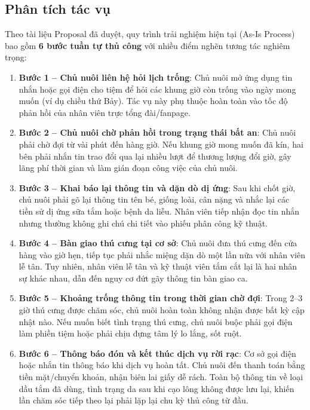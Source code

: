 \subsection{Phân tích tác vụ}
Theo tài liệu Proposal đã duyệt, quy trình trải nghiệm hiện tại (As-Is Process) bao gồm \textbf{6 bước tuần tự thủ công} với nhiều điểm nghẽn tương tác nghiêm trọng:
\begin{enumerate}
    \item \textbf{Bước 1 -- Chủ nuôi liên hệ hỏi lịch trống}: Chủ nuôi mở ứng dụng tin nhắn hoặc gọi điện cho tiệm để hỏi các khung giờ còn trống vào ngày mong muốn (ví dụ chiều thứ Bảy). Tác vụ này phụ thuộc hoàn toàn vào tốc độ phản hồi của nhân viên trực tổng đài/fanpage.
    \item \textbf{Bước 2 -- Chủ nuôi chờ phản hồi trong trạng thái bất an}: Chủ nuôi phải chờ đợi từ vài phút đến hàng giờ. Nếu khung giờ mong muốn đã kín, hai bên phải nhắn tin trao đổi qua lại nhiều lượt để thương lượng đổi giờ, gây lãng phí thời gian và làm gián đoạn công việc của chủ nuôi.
    \item \textbf{Bước 3 -- Khai báo lại thông tin và dặn dò dị ứng}: Sau khi chốt giờ, chủ nuôi phải gõ lại thông tin tên bé, giống loài, cân nặng và nhắc lại các tiền sử dị ứng sữa tắm hoặc bệnh da liễu. Nhân viên tiếp nhận đọc tin nhắn nhưng thường không ghi chú chi tiết vào phiếu phân công kỹ thuật.
    \item \textbf{Bước 4 -- Bàn giao thú cưng tại cơ sở}: Chủ nuôi đưa thú cưng đến cửa hàng vào giờ hẹn, tiếp tục phải nhắc miệng dặn dò một lần nữa với nhân viên lễ tân. Tuy nhiên, nhân viên lễ tân và kỹ thuật viên tắm cắt lại là hai nhân sự khác nhau, dẫn đến nguy cơ đứt gãy thông tin bàn giao ca.
    \item \textbf{Bước 5 -- Khoảng trống thông tin trong thời gian chờ đợi}: Trong 2--3 giờ thú cưng được chăm sóc, chủ nuôi hoàn toàn không nhận được bất kỳ cập nhật nào. Nếu muốn biết tình trạng thú cưng, chủ nuôi buộc phải gọi điện làm phiền tiệm hoặc phải chịu đựng tâm lý lo lắng, sốt ruột.
    \item \textbf{Bước 6 -- Thông báo đón và kết thúc dịch vụ rời rạc}: Cơ sở gọi điện hoặc nhắn tin thông báo khi dịch vụ hoàn tất. Chủ nuôi đến thanh toán bằng tiền mặt/chuyển khoản, nhận biên lai giấy dễ rách. Toàn bộ thông tin về loại dầu tắm đã dùng, tình trạng da sau khi cạo lông không được lưu lại, khiến lần chăm sóc tiếp theo lại phải lặp lại chu kỳ thủ công từ đầu.
\end{enumerate}

